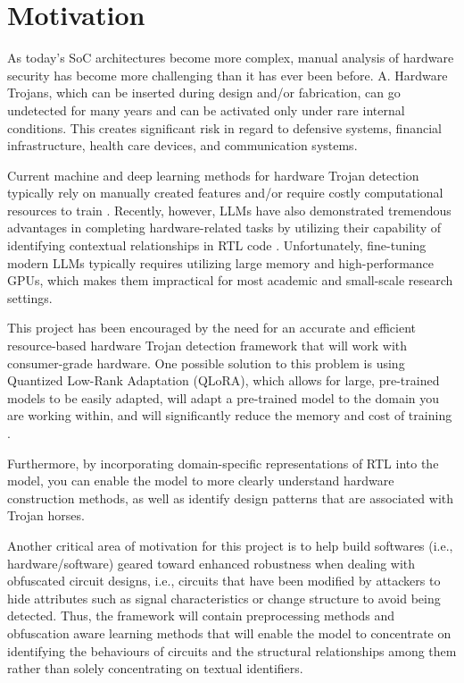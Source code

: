 \documentclass[12pt,a4paper]{report}
\begin{document}
\section{Motivation}

As today's SoC architectures become more complex, manual analysis of hardware security has become more challenging than it has ever been before. A. Hardware Trojans, which can be inserted during design and/or fabrication, can go undetected for many years and can be activated only under rare internal conditions. This creates significant risk in regard to defensive systems, financial infrastructure, health care devices, and communication systems.

Current machine and deep learning methods for hardware Trojan detection typically rely on manually created features and/or require costly computational resources to train \cite{ref4,ref5}. Recently, however, LLMs have also demonstrated tremendous advantages in completing hardware-related tasks by utilizing their capability of identifying contextual relationships in RTL code \cite{ref1,ref3,ref5}. Unfortunately, fine-tuning modern LLMs typically requires utilizing large memory and high-performance GPUs, which makes them impractical for most academic and small-scale research settings.

This project has been encouraged by the need for an accurate and efficient resource-based hardware Trojan detection framework that will work with consumer-grade hardware. One possible solution to this problem is using Quantized Low-Rank Adaptation (QLoRA), which allows for large, pre-trained models to be easily adapted, will adapt a pre-trained model to the domain you are working within, and will significantly reduce the memory and cost of training \cite{ref9}.

Furthermore, by incorporating domain-specific representations of RTL into the model, you can enable the model to more clearly understand hardware construction methods, as well as identify design patterns that are associated with Trojan horses. 

Another critical area of motivation for this project is to help build softwares (i.e., hardware/software) geared toward enhanced robustness when dealing with obfuscated circuit designs, i.e., circuits that have been modified by attackers to hide attributes such as signal characteristics or change structure to avoid being detected. Thus, the framework will contain preprocessing methods and obfuscation aware learning methods that will enable the model to concentrate on identifying the behaviours of circuits and the structural relationships among them rather than solely concentrating on textual identifiers.
\end{document}
